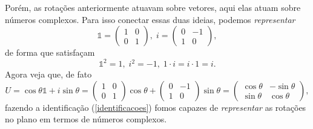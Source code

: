 \documentclass{article}
\numberwithin{equation}{section}
\numberwithin{figure}{section}
\begin{document}
Porém, as rotações anteriormente atuavam sobre vetores, aqui elas atuam sobre números complexos. Para isso conectar essas duas ideias, podemos \textit{representar}
\begin{equation}\label{identificacoes}
	\mathds{1}=\begin{pmatrix}
		1 & 0 \\
		0 & 1
	\end{pmatrix},\;i=\begin{pmatrix}
	0 & -1 \\
	1 & 0
	\end{pmatrix}, 
\end{equation}
de forma que satisfaçam 
\begin{equation}
	\mathds{1}^2=1,\; i^2=-1,\; 1\cdot i=i\cdot 1=i.
\end{equation}
Agora veja que, de fato 
\begin{equation}
	U=\cos\theta\mathds{1}+i\sin\theta=\begin{pmatrix}
		1 & 0 \\
		0 & 1
	\end{pmatrix}\cos\theta+\begin{pmatrix}
	0 & -1 \\
	1 & 0
	\end{pmatrix}\sin\theta=\begin{pmatrix}
	\cos\theta & -\sin\theta \\
	\sin\theta & \cos\theta
	\end{pmatrix},
\end{equation} 
fazendo a identificação (\ref{identificacoes}) fomos capazes de \textit{representar} as rotações no plano em termos de números complexos. 
\end{document}

